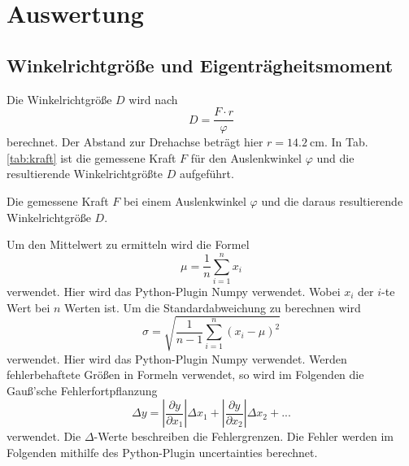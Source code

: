 \section{Auswertung}
\label{sec:Auswertung}
\subsection{Winkelrichtgröße und Eigenträgheitsmoment}
Die Winkelrichtgröße $D$ wird nach
\begin{equation*}
    D = \frac{F \cdot r}{\varphi}
\end{equation*} 
berechnet.
Der Abstand zur Drehachse beträgt hier $r=\SI{14.2}{\centi\metre}$.
In Tab. \ref{tab:kraft} ist die gemessene Kraft $F$ für den Auslenkwinkel $\varphi$ und die resultierende Winkelrichtgrößte $D$ aufgeführt.
\begin{table}
    \centering
    \caption{Die gemessene Kraft $F$ bei einem Auslenkwinkel $\varphi$ und die daraus resultierende Winkelrichtgröße $D$.}
    \label{tab:kraft}  
\end{table}
\FloatBarrier
Um den Mittelwert zu ermitteln wird die Formel
\begin{equation}
    \mu = \frac{1}{n} \sum_{i=1}^n x_i
\end{equation}
verwendet. Hier wird das Python-Plugin Numpy \cite{numpy} verwendet.
Wobei $x_i$ der $i$-te Wert bei $n$ Werten ist.
Um die Standardabweichung zu berechnen wird
\begin{equation}
    \sigma = \sqrt{\frac{1}{n-1} \sum_{i=1}^n (x_i - \mu)^2}
\end{equation}
verwendet. Hier wird das Python-Plugin Numpy \cite{numpy} verwendet.
Werden fehlerbehaftete Größen in Formeln verwendet, so wird im Folgenden die Gauß'sche Fehlerfortpflanzung 
\begin{equation}
    \Delta y = \left|\frac{\partial y}{\partial x_1}\right| \Delta x_1 + \left|\frac{\partial y}{\partial x_2}\right| \Delta x_2 + ...
\end{equation}
verwendet. Die $\Delta$-Werte beschreiben die Fehlergrenzen.
Die Fehler werden im Folgenden mithilfe des Python-Plugin uncertainties \cite{uncertainties} berechnet.
\\
